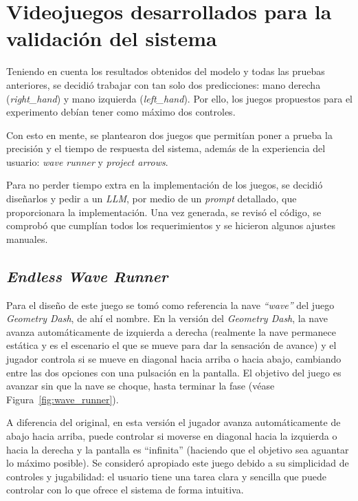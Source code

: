 \section{Videojuegos desarrollados para la validación del sistema}
\label{sec:videojuegosDesarrollados}

Teniendo en cuenta los resultados obtenidos del modelo y todas las pruebas anteriores, se decidió trabajar con tan solo dos predicciones: mano derecha (\textit{right\_hand}) y mano izquierda (\textit{left\_hand}). Por ello, los juegos propuestos para el experimento debían tener como máximo dos controles.

Con esto en mente, se plantearon dos juegos que permitían poner a prueba la precisión y el tiempo de respuesta del sistema, además de la experiencia del usuario: \textit{wave runner} y \textit{project arrows}.

Para no perder tiempo extra en la implementación de los juegos, se decidió diseñarlos y pedir a un \textit{LLM}, por medio de un \textit{prompt} detallado, que proporcionara la implementación. Una vez generada, se revisó el código, se comprobó que cumplían todos los requerimientos y se hicieron algunos ajustes manuales.

\subsection{\textit{Endless Wave Runner}}
\label{subsec:endless_wave_runner}

Para el diseño de este juego se tomó como referencia la nave \textit{``wave''} del juego \textit{Geometry Dash}, de ahí el nombre. En la versión del \textit{Geometry Dash}, la nave avanza automáticamente de izquierda a derecha (realmente la nave permanece estática y es el escenario el que se mueve para dar la sensación de avance) y el jugador controla si se mueve en diagonal hacia arriba o hacia abajo, cambiando entre las dos opciones con una pulsación en la pantalla. El objetivo del juego es avanzar sin que la nave se choque, hasta terminar la fase (véase Figura~\ref{fig:wave_runner}). 

A diferencia del original, en esta versión el jugador avanza automáticamente de abajo hacia arriba, puede controlar si moverse en diagonal hacia la izquierda o hacia la derecha y la pantalla es ``infinita'' (haciendo que el objetivo sea aguantar lo máximo posible). Se consideró apropiado este juego debido a su simplicidad de controles y jugabilidad: el usuario tiene una tarea clara y sencilla que puede controlar con lo que ofrece el sistema de forma intuitiva. 


